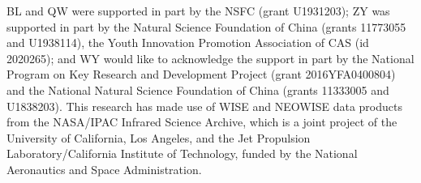 \documentclass[linenumbers]{aastex631}
\newcommand{\maxi}{{\small \it MAXI}}
\newcommand{\uvot}{{\small {\it Swift}/UVOT}}
\begin{document}
\begin{acknowledgments}
BL and QW were supported in part by the NSFC (grant U1931203); ZY was supported in part by the Natural Science Foundation of China (grants 11773055 and U1938114), the Youth Innovation Promotion Association of CAS (id 2020265); and WY would like to acknowledge the support in part by the National Program on Key Research and Development Project (grant 2016YFA0400804) and the National Natural Science Foundation of China (grants 11333005 and U1838203).
This research has made use of WISE and NEOWISE data products from the NASA/IPAC Infrared Science Archive, which is a joint project of the University of California, Los Angeles, and the Jet Propulsion Laboratory/California Institute of Technology, funded by the National Aeronautics and Space Administration. 



\end{acknowledgments}

%



\facilities{\textit{WISE}, \uvot\,, ASAS-SN}%


\end{document}
